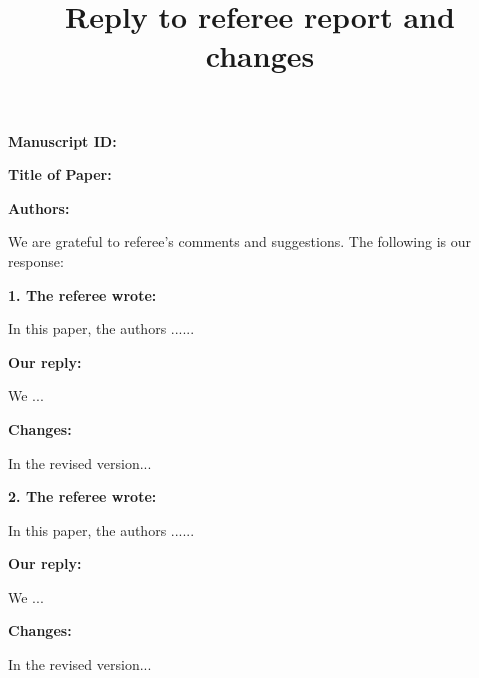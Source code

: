 \documentclass[11pt]{article}
\begin{document}
\title{Reply to referee report and changes}

\date{}
\author{}
\maketitle

\noindent\textbf{Manuscript ID:} 


\noindent\textbf{Title of Paper:} 

\noindent\textbf{Authors:} 

We are grateful to referee's comments and suggestions. The following is our response:


\textbf{1. The referee wrote:}

In this paper, the authors ......

\textbf{Our reply:}

We ...

\textbf{Changes:}

In the revised version...

\textbf{2. The referee wrote:}

In this paper, the authors ......

\textbf{Our reply:}

We ...

\textbf{Changes:}

In the revised version...
\end{document}
